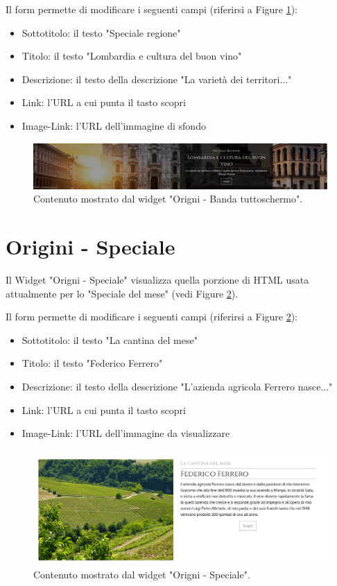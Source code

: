 Il form permette di modificare i seguenti campi (riferirsi a Figure \ref{fig:oreg}):
\begin{itemize}
\item Sottotitolo: il testo "Speciale regione"
\item Titolo: il testo "Lombardia e cultura del buon vino"
\item Descrizione: il testo della descrizione "La varietà dei territori..."
\item Link: l'URL a cui punta il tasto scopri
\item Image-Link: l'URL dell'immagine di sfondo
\end{itemize}

\begin{figure}
  \includegraphics[width=\textwidth]{figure/oreg.png}
  \caption{Contenuto mostrato dal widget "Origni - Banda tuttoschermo".}
  \label{fig:oreg}
\end{figure}

\newpage
\section{Origini - Speciale}
Il Widget "Origni - Speciale" visualizza quella porzione di HTML
usata attualmente per lo "Speciale del mese" (vedi Figure \ref{fig:ospec}).

Il form permette di modificare i seguenti campi (riferirsi a Figure \ref{fig:ospec}):
\begin{itemize}
\item Sottotitolo: il testo "La cantina del mese"
\item Titolo: il testo "Federico Ferrero"
\item Descrizione: il testo della descrizione "L’azienda agricola Ferrero nasce..."
\item Link: l'URL a cui punta il tasto scopri
\item Image-Link: l'URL dell'immagine da visualizzare
\end{itemize}

\begin{figure}
  \includegraphics[width=\textwidth]{figure/ospec.png}
  \caption{Contenuto mostrato dal widget "Origni - Speciale".}
  \label{fig:ospec}
\end{figure}

